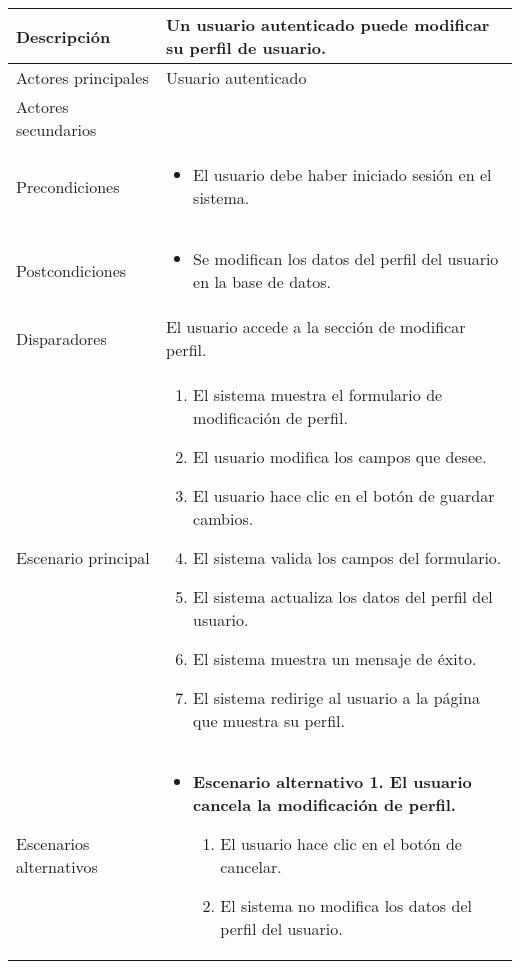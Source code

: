 \begin{longtable}{
    >{\columncolor{lightgreen!20}}p{4cm}
    p{12cm}
    }
    \midrule
    Descripción & Un usuario autenticado puede modificar su perfil de usuario. \\
    \midrule
    Actores principales & Usuario autenticado \\
    \midrule
    Actores secundarios &  \\
    \midrule
    Precondiciones & \begin{itemize}[nosep,leftmargin=*]
        \item El usuario debe haber iniciado sesión en el sistema.
    \end{itemize} \\
    \midrule
    Postcondiciones & \begin{itemize}[nosep,leftmargin=*]
        \item Se modifican los datos del perfil del usuario en la base de datos.
    \end{itemize} \\
    \midrule
    Disparadores & El usuario accede a la sección de modificar perfil. \\
    \midrule
    Escenario principal & \begin{enumerate}[nosep,leftmargin=*]
        \item El sistema muestra el formulario de modificación de perfil.
        \item El usuario modifica los campos que desee.
        \item El usuario hace clic en el botón de guardar cambios.
        \item El sistema valida los campos del formulario.
        \item El sistema actualiza los datos del perfil del usuario.
        \item El sistema muestra un mensaje de éxito.
        \item El sistema redirige al usuario a la página que muestra su perfil.
    \end{enumerate} \\
    \midrule
    Escenarios alternativos & 
    \begin{itemize}[nosep,leftmargin=*]
        \item \textbf{Escenario alternativo 1. El usuario cancela la modificación de perfil.}
        \begin{enumerate}[nosep,leftmargin=*]
            \item El usuario hace clic en el botón de cancelar.
            \item El sistema no modifica los datos del perfil del usuario.

\end{enumerate}
\end{itemize}
\end{longtable}
